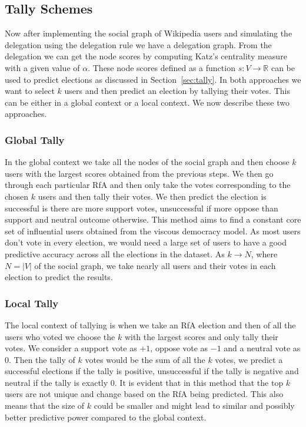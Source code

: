 \subsection{Tally Schemes}
Now after implementing the social graph of Wikipedia users and simulating the delegation using the delegation rule we have a delegation graph. From the delegation we can get the node scores by computing Katz's centrality measure with a given value of $\alpha$. These node scores defined as a function $s:V\rightarrow \mathbb{R}$ can be used to predict elections as discussed in Section~\ref{sec:tally}. In both approaches we want to select $k$ users and then predict an election by tallying their votes. This can be either in a global context or a local context. We now describe these two approaches.
\subsubsection{Global Tally}
In the global context we take all the nodes of the social graph and then choose $k$ users with the largest scores obtained from the previous steps. We then go through each particular RfA and then only take the votes corresponding to the chosen $k$ users and then tally their votes. We then predict the election is successful is there are more support votes, unsuccessful if more oppose than support and neutral outcome otherwise. This method aims to find a constant core set of influential users obtained from the viscous democracy model. As most users don't vote in every election, we would need a large set of users to have a good predictive accuracy across all the elections in the dataset. As $k\rightarrow N$, where $N= |V|$ of the social graph, we take nearly all users and their votes in each election to predict the results. 
\subsubsection{Local Tally}
The local context of tallying is when we take an RfA election and then of all the users who voted we choose the $k$ with the largest scores and only tally their votes. We consider a support vote as $+1$, oppose vote as $-1$ and a neutral vote as $0$. Then the tally of $k$ votes would be the sum of all the $k$ votes, we predict a successful elections if the tally is positive, unsuccessful if the tally is negative and neutral if the tally is exactly 0. It is evident that in this method that the top $k$ users are not unique and change based on the RfA being predicted. This also means that the size of $k$ could be smaller and might lead to similar and possibly better predictive power compared to the global context.

